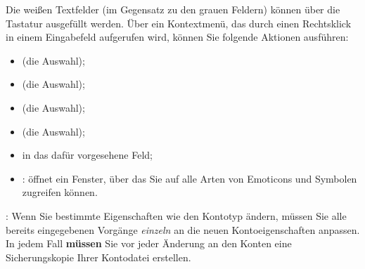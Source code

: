 Die weißen Textfelder (im Gegensatz zu den grauen Feldern) können über die Tastatur ausgefüllt werden. Über ein Kontextmenü, das durch einen Rechtsklick in einem Eingabefeld aufgerufen wird, können Sie folgende Aktionen ausführen:
\begin{itemize}
	\item {} (die Auswahl);
	\item {} (die Auswahl);
	\item {} (die Auswahl);
	\item {} (die Auswahl);
	\item {} in das dafür vorgesehene Feld;
	\item {}: öffnet ein Fenster, über das Sie auf alle Arten von Emoticons und Symbolen zugreifen können.
\end{itemize}


\Attention{}: Wenn Sie bestimmte Eigenschaften wie den Kontotyp ändern, müssen Sie alle bereits eingegebenen Vorgänge \emph{einzeln} an die neuen Kontoeigenschaften anpassen. In jedem Fall \textbf{müssen} Sie vor jeder Änderung an den Konten eine Sicherungskopie Ihrer Kontodatei erstellen.


